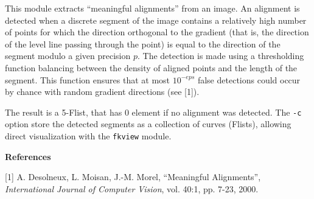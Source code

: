 This module extracts ``meaningful alignments'' from an image.
An alignment is detected when a discrete segment of the image
contains a relatively high number of points for which the
direction orthogonal to the gradient (that is, the direction 
of the level line passing through the point) is equal to the direction
of the segment modulo a given precision $p$. The detection is made
using a thresholding function balancing between the density of
aligned points and the length of the segment. This function ensures
that at most $10^{-eps}$ false detections could occur by chance
with random gradient directions (see [1]).

\medskip

The result is a 5-Flist, that has 0 element if no alignment was detected.
The \verb+-c+ option store the detected segments as a collection of curves
(Flists), allowing direct visualization with the \verb+fkview+ module.

\bigskip

{\large \bf References}

\medskip

[1] A. Desolneux, L. Moisan, J.-M. Morel, ``Meaningful Alignments'', 
{\it International Journal of Computer Vision}, vol. 40:1, pp. 7-23, 2000.